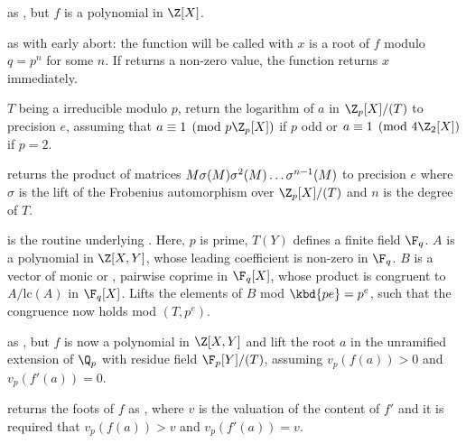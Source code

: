 as , but $f$ is a polynomial in $\Z[X]$.

as  with early abort: the function 
will be called with $x$ is a root of $f$ modulo $q=p^n$ for some $n$. If
 returns a non-zero value, the function returns $x$ immediately.

 $T$ being a 
irreducible modulo $p$, return the logarithm of $a$ in $\Z_p[X]/(T)$ to
precision $e$, assuming that $a\equiv 1 \pmod{p\Z_p[X]}$ if $p$ odd or
$a\equiv 1 \pmod{4\Z_2[X]}$ if $p=2$.




returns the product of matrices $M\*\sigma(M)\*\sigma^2(M)\ldots\sigma^{n-1}(M)$
to precision $e$ where $\sigma$ is the lift of the Frobenius automorphism
over $\Z_p[X]/(T)$ and $n$ is the degree of $T$.


 is the
routine underlying . Here, $p$ is prime, $T(Y)$ defines a
finite field $\F_q$. $A$ is a polynomial in $\Z[X,Y]$, whose leading
coefficient is non-zero in $\F_q$. $B$ is a vector of monic or ,
pairwise coprime in $\F_q[X]$, whose product is congruent to $A/\text{lc}(A)$
in $\F_q[X]$. Lifts the elements of $B$ mod $\kbd{pe} = p^e$, such that the
congruence now holds mod $(T,p^e)$.

 as
, but $f$ is now a polynomial in $\Z[X,Y]$ and lift the
root $a$ in the unramified extension of $\Q_p$ with residue field $\F_p[Y]/(T)$,
assuming $v_p(f(a))>0$ and $v_p(f'(a))=0$.

returns the foots of $f$ as , where $v$ is the valuation
of the content of $f'$ and it is required that $v_p(f(a))>v$ and
$v_p(f'(a))=v$.


